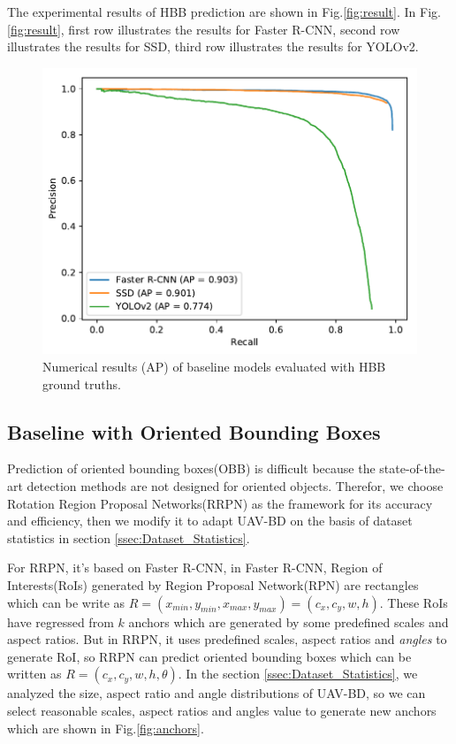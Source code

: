 The experimental results of HBB prediction are shown in Fig.\ref{fig:result}. In Fig.\ref{fig:result}, first row illustrates the results for Faster R-CNN, second row illustrates the results for SSD, third row illustrates the results for YOLOv2.


\begin{figure}
	\includegraphics[width=\linewidth]{images/pr_bbox.pdf}
	\caption{Numerical results (AP) of baseline models evaluated with HBB ground truths.}
	\label{fig:pr_bbox}
\end{figure}

\subsection{Baseline with Oriented Bounding Boxes}

Prediction of oriented bounding boxes(OBB) is difficult because the state-of-the-art detection methods are not designed for oriented objects. Therefor, we choose Rotation Region Proposal Networks(RRPN)\cite{RRPN} as the framework for its accuracy and efficiency, then we modify it to adapt UAV-BD on the basis of dataset statistics in section \ref{ssec:Dataset_Statistics}.

For RRPN, it's based on Faster R-CNN, in Faster R-CNN, Region of Interests(RoIs) generated by Region Proposal Network(RPN) are rectangles which can be write as $ R = (x_{min}, y_{min}, x_{max}, y_{max}) = (c_x, c_y, w, h) $. These RoIs have regressed from $ k $ anchors which are generated by some predefined scales and aspect ratios. But in RRPN, it uses predefined scales, aspect ratios and \textit{angles} to generate RoI, so RRPN can predict oriented bounding boxes which can be written as $ R=(c_x, c_y, w, h, \theta) $. In the section \ref{ssec:Dataset_Statistics}, we analyzed the size, aspect ratio and angle distributions of UAV-BD, so we can select reasonable scales, aspect ratios and angles value to generate new anchors which are shown in Fig.\ref{fig:anchors}. 

